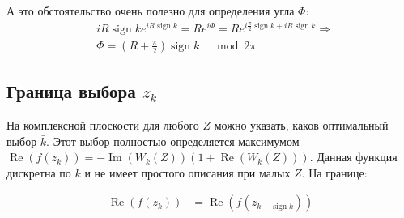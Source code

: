 \documentclass[a4paper, 12pt]{article}
\DeclareMathOperator*{\sign}{sign}
\DeclareMathOperator*{\Real}{Re}
\DeclareMathOperator*{\Imag}{Im}
\begin{document}
А это обстоятельство очень полезно для определения угла $\Phi$:
\begin{equation}
\begin{aligned}
    &i R \sign k  e^{i R \sign k } = R e^{i\Phi} = R e^{i\frac{\pi}{2}\sign k + i R \sign k} \Rightarrow \\ 
    &\Phi = \left(R+\frac{\pi}{2}\right)\sign k \;\;\; \mod 2\pi
\end{aligned}
\end{equation}
\subsection*{Граница выбора $z_k$}
На комплексной плоскости для любого $Z$ можно указать, каков оптимальный выбор $\bar{k}$. Этот выбор полностью определяется максимумом $\Real\left(f(z_k)\right) = -\Imag(W_k(Z))\left(1+\Real(W_k(Z))\right)$. 
Данная функция дискретна по $k$ и не имеет простого описания при малых $Z$. На границе:

\begin{equation}
\begin{aligned}
    \Real\left(f(z_k)\right) &= \Real\left(f(z_{k+\sign k})\right) \\
\end{aligned}
\end{equation}
\end{document}
